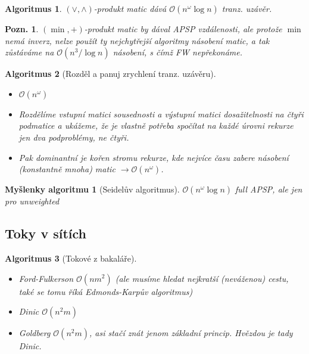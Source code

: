 \documentclass{article}
\theoremstyle{noparens}
\newtheorem*{alg}{Algoritmus}
\theoremstyle{noparens-mys}
\newtheorem*{alg-mys}{Myšlenky algoritmu}
\theoremstyle{noparens-note}
\newtheorem*{note}{Pozn.}
\newcommand{\OO}{\mathcal{O}}
\begin{document}
\begin{alg}
    $(\lor, \land)$-produkt matic dává $\OO(n^\omega \log n)$ tranz. uzávěr.
\end{alg}

\begin{note}
    $(\min, +)$-produkt matic by dával APSP vzdálenosti, ale protože $\min$
    nemá inverz, nelze použít ty nejchytřejší algoritmy násobení matic, a tak
    zůstáváme na $\OO(n^3 / \log n)$ násobení, s čímž FW nepřekonáme.
\end{note}

\begin{alg}[Rozděl a panuj zrychlení tranz. uzávěru]
    ~

    \begin{itemize}
        \item $\OO(n^\omega)$
        \item Rozdělíme vstupní matici sousednosti a výstupní matici
            dosažitelnosti na čtyři podmatice a ukážeme, že je vlastně potřeba
            spočítat na každé úrovni rekurze jen dva podproblémy, ne čtyři.
        \item Pak dominantní je kořen stromu rekurze, kde nejvíce času zabere
            násobení (konstantně mnoha) matic $\rightarrow \OO(n^\omega)$.
    \end{itemize}
\end{alg}

\begin{alg-mys}[Seidelův algoritmus]
$\OO(n^\omega \log n)$ full APSP, ale jen pro unweighted
\end{alg-mys}


\subsection{Toky v sítích}

\begin{alg}[Tokové z bakaláře]
~
    \begin{itemize}
        \item Ford-Fulkerson $\OO(nm^2)$ (ale musíme hledat nejkratší
            (neváženou) cestu, také se tomu říká Edmonds-Karpův algoritmus)

        \item Dinic $\OO(n^2m)$

        \item Goldberg $\OO(n^2m)$, asi stačí znát jenom základní princip.
            Hvězdou je tady Dinic.
    \end{itemize}
\end{alg}
\end{document}
